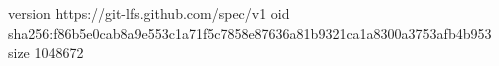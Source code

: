 version https://git-lfs.github.com/spec/v1
oid sha256:f86b5e0cab8a9e553c1a71f5c7858e87636a81b9321ca1a8300a3753afb4b953
size 1048672
